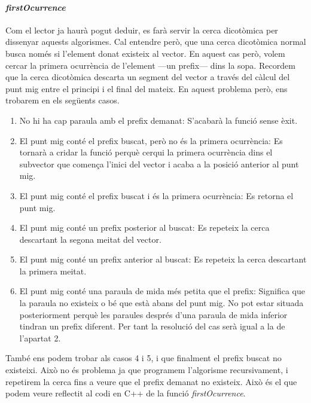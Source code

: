 \documentclass[titlepage]{article}
\begin{document}
\paragraph{\textit{firstOcurrence}} Com el lector ja haurà pogut deduir, es farà servir la cerca dicotòmica per dissenyar aquests algorismes. Cal entendre però, que una cerca dicotòmica normal busca només si l'element donat existeix al vector. En aquest cas però, volem cercar la primera ocurrència de l'element —un prefix— dins la sopa.
Recordem que la cerca dicotòmica descarta un segment del vector a través del càlcul del punt mig entre el  principi i el final del mateix. En aquest problema però, ens trobarem en els següents casos.
\begin{enumerate}
  \item No hi ha cap paraula amb el prefix demanat: S'acabarà la funció sense èxit.
  \item El punt mig conté el prefix buscat, però no és la primera ocurrència: Es tornarà a cridar la funció perquè cerqui la primera ocurrència dins el subvector que comença l'inici del vector i acaba a la posició anterior al punt mig.
  \item El punt mig conté el prefix buscat i és la primera ocurrència: Es retorna el punt mig.
  \item El punt mig conté un prefix posterior al buscat: Es repeteix la cerca descartant la segona meitat del vector.
  \item El punt mig conté un prefix anterior al buscat: Es repeteix la cerca descartant la primera  meitat.
  \item El punt mig conté una paraula de mida més petita que el prefix: Significa que la paraula no existeix o bé que està abans del punt mig. No pot estar situada posteriorment perquè les paraules després d'una paraula de mida inferior tindran un prefix diferent. Per tant la resolució del cas serà igual a la de l'apartat 2.
\end{enumerate}
També ens podem trobar als casos 4 i 5, i que finalment el prefix buscat no existeixi. Això no és problema ja que programem l'algorisme recursivament, i repetirem la cerca fins a veure que el prefix demanat no existeix. Això és el que podem veure reflectit al codi en C++ de la funció \textit{firstOcurrence}.\newline
\end{document}
